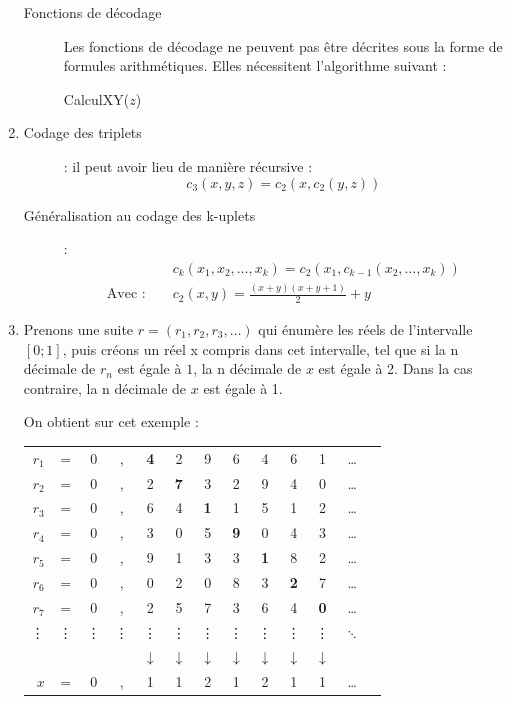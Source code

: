 \begin{enumerate}
\begin{description}
\item[Fonctions de décodage]
Les fonctions de décodage ne peuvent pas être décrites sous la forme de formules arithmétiques. Elles nécessitent l'algorithme suivant :

\begin{algorithm}[H]
  \caption{CalculXY($z$)}
\end{algorithm}
\end{description}

\item 
\begin{description}
\item[Codage des triplets] : il peut avoir lieu de manière récursive :
\[ c_3(x,y,z)=c_2(x,c_2(y,z)) \]
\item[Généralisation au codage des k-uplets] : 
\begin{eqnarray*}
& &c_k(x_1,x_2,\ldots,x_k)=c_2(x_1,c_{k-1}(x_2,\ldots,x_k)) \\
\textrm{Avec : } & &c_2(x,y)=\frac{(x+y)(x+y+1)}{2}+y
\end{eqnarray*}



\end{description}

\item Prenons une suite $r=(r_1,r_2,r_3,\ldots)$ qui énumère les réels de l'intervalle $[0;1]$, puis créons un réel x compris dans cet intervalle, tel que si la n décimale de $r_n$ est égale à $1$, la n décimale de $x$ est égale à 2. Dans la cas contraire, la n décimale de $x$ est égale à 1.

On obtient sur cet exemple :

\begin{tabular}{r c c c c c c c c c c c c}
$r_1$ & = &0&,&\textbf{4}&2&9&6&4&6&1 &\ldots\\
$r_2$ & = &0&,&2&\textbf{7}&3&2&9&4&0 &\ldots\\
$r_3$ & = &0&,&6&4&\textbf{1}&1&5&1&2 &\ldots\\
$r_4$ & = &0&,&3&0&5&\textbf{9}&0&4&3 &\ldots\\
$r_5$ & = &0&,&9&1&3&3&\textbf{1}&8&2 &\ldots\\
$r_6$ & = &0&,&0&2&0&8&3&\textbf{2}&7 &\ldots\\
$r_7$ & = &0&,&2&5&7&3&6&4&\textbf{0} &\ldots\\
\vdots & \vdots & \vdots & \vdots & \vdots & \vdots & \vdots & \vdots & \vdots & \vdots & \vdots & $\ddots$ \\
&&&&$\downarrow$ &$\downarrow$ &$\downarrow$ &$\downarrow$ &$\downarrow$ &$\downarrow$ &$\downarrow$ &\\
$x$ & = &0&,&1&1&2&1&2&1&1&\ldots\\
\end{tabular}


\end{enumerate}
